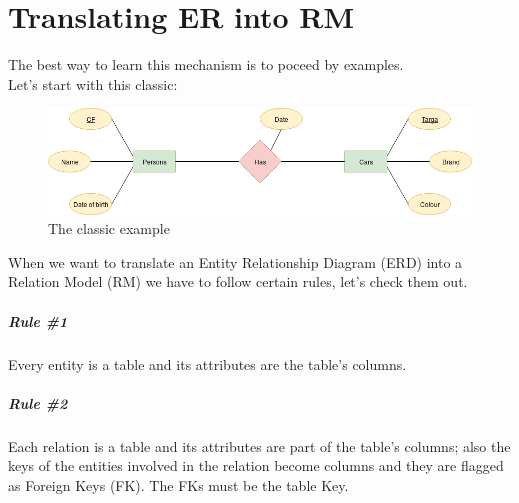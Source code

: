 \documentclass[class=book, crop=false, oneside]{standalone}
\begin{document}

\chapter{Translating ER into RM}
The best way to learn this mechanism is to poceed by examples.\\
Let's start with this classic:

\begin{figure}[H]
	\centering
	\includegraphics[width=\textwidth,keepaspectratio]{diagram1_00.png}
	\caption{The classic example}
	\label{diagram1_00}
\end{figure}

When we want to translate an Entity Relationship Diagram (ERD) into a Relation Model (RM) we have to follow certain rules, let's check them out.
\paragraph*{Rule \#1} Every entity is a table and its attributes are the table's columns.
\paragraph*{Rule \#2} Each relation is a table and its attributes are part of the table's columns; also the keys of the entities involved in the relation become columns and they are flagged as Foreign Keys (FK). The FKs must be the table Key.\\
\end{document}
